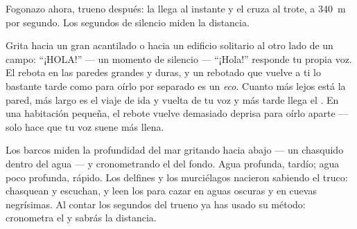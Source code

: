 \begin{omfigure}

{\small Fogonazo ahora, trueno después: la  llega al instante y el
 cruza al trote, a \qty{340}{m} por segundo. Los segundos de
silencio miden la distancia.}
\end{omfigure}

\begin{example}\label{ex:g4:how-sound-travels:echo}
Grita hacia un gran acantilado o hacia un edificio solitario al otro
lado de un campo: ``¡HOLA!'' --- un momento de silencio --- ``¡Hola!''
responde tu propia voz. El  rebota en las paredes grandes y
duras, y un  rebotado que vuelve a ti lo bastante tarde como
para oírlo por separado es un \emph{eco}. Cuanto más lejos
está la pared, más largo es el viaje de ida y vuelta de tu voz y más
tarde llega el . En una habitación pequeña, el rebote vuelve
demasiado deprisa para oírlo aparte --- solo hace que tu voz
suene más llena.
\end{example}

\begin{remark}\label{rem:g4:how-sound-travels:sonar}
Los barcos miden la profundidad del mar gritando hacia abajo --- un
chasquido dentro del agua --- y cronometrando el  del fondo. Agua
profunda,  tardío; agua poco profunda,  rápido. Los delfines
y los murciélagos nacieron sabiendo el truco: chasquean y escuchan, y
leen los  para cazar en aguas oscuras y en cuevas negrísimas. Al
contar los segundos del trueno ya has usado su método: cronometra el
 y sabrás la distancia.
\end{remark}

